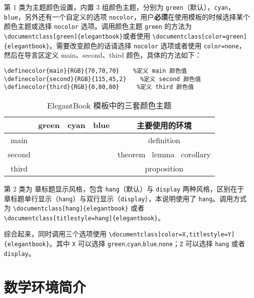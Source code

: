 \documentclass[titlestyle=hang,11pt]{elegantbook}
\begin{document}
第 1 类为{\color{main}主题颜色}设置，内置 3 组颜色主题，分别为 \verb|green|（默认），\verb|cyan|，\verb|blue|，另外还有一个自定义的选项 \verb|nocolor|，用户\textbf{必须}在使用模板的时候选择某个颜色主题或选择 \verb|nocolor| 选项。调用颜色主题 \verb|green| 的方法为 \verb|\documentclass[green]{elegantbook}|或者使用 \verb|\documentclass[color=green]{elegantbook}|。需要改变颜色的话请选择 \verb|nocolor| 选项或者使用 \verb|color=none|，然后在导言区定义 main、second、third 颜色，具体的方法如下：
\begin{verbatim}
\definecolor{main}{RGB}{70,70,70}    %定义 main 颜色值
\definecolor{second}{RGB}{115,45,2}    %定义 second 颜色值
\definecolor{third}{RGB}{0,80,80}     %定义 third 颜色值
\end{verbatim}

\begin{table}[htp]
\centering
\begin{tabular}{ccccc}
\toprule
	  & green & cyan & blue & 主要使用的环境\\
\midrule
main & \makecell{{\color{main1}\rule{1cm}{1cm}}}& \makecell{{\color{main2}\rule{1cm}{1cm}}}&\makecell{ {\color{main3}\rule{1cm}{1cm}}}& definition \\

second &\makecell{ {\color{second1}\rule{1cm}{1cm}}}& \makecell{{\color{second2}\rule{1cm}{1cm}}}&\makecell{ {\color{second3}\rule{1cm}{1cm}}}&theorem \ lemma \ corollary\\

third &\makecell{ {\color{third1}\rule{1cm}{1cm}}}& \makecell{{\color{third2}\rule{1cm}{1cm}}}&\makecell{ {\color{third3}\rule{1cm}{1cm}}}&proposition\\
\bottomrule
\end{tabular}
\caption{ElegantBook 模板中的三套颜色主题\label{tab:color thm}}
\end{table}

第 2 类为{\color{main} 章标题显示风格}，包含 \verb|hang|（默认）与 \verb|display| 两种风格，区别在于章标题单行显示（\verb|hang|）与双行显示（\verb|display|），本说明使用了 \verb|hang|。调用方式为 \verb|\documentclass[hang]{elegantbook}| 或者 \verb|\documentclass[titlestyle=hang]{elegantbook}|。

综合起来，同时调用三个选项使用 \verb|\documentclass[color=X,titlestyle=Y]{elegantbook}|。其中 \verb|X| 可以选择 \verb|green|,\verb|cyan|,\verb|blue|,\verb|none|；\verb|Z| 可以选择 \verb|hang| 或者 \verb|display|。

\section{数学环境简介}
\end{document}
